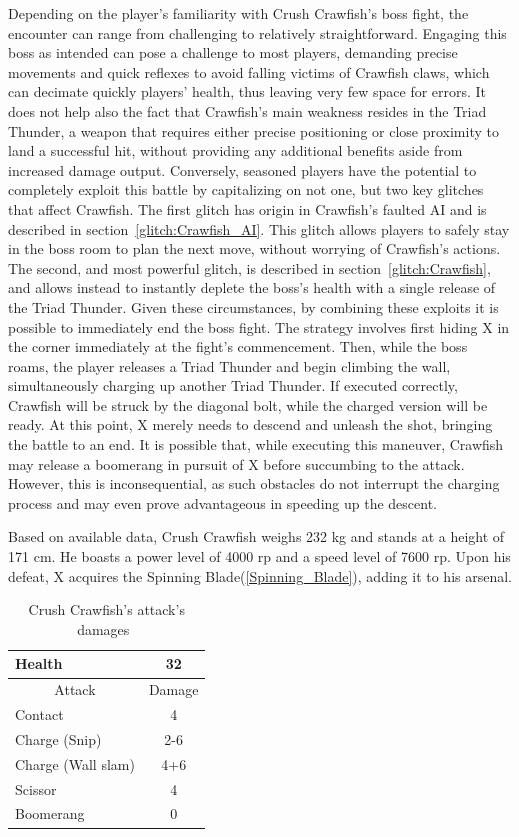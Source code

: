 Depending on the player's familiarity with Crush Crawfish's boss fight, the encounter can range from challenging to relatively straightforward. Engaging this boss as intended can pose a challenge to most players, demanding precise movements and quick reflexes to avoid falling victims of Crawfish claws, which can decimate quickly players' health, thus leaving very few space for errors. It does not help also the fact that Crawfish's main weakness resides in the Triad Thunder, a weapon that requires either precise positioning or close proximity to land a successful hit, without providing any additional benefits aside from increased damage output. Conversely, seasoned players have the potential to completely exploit this battle by capitalizing on not one, but two key glitches that affect Crawfish. The first glitch has origin in Crawfish's faulted AI  and is described in section~\ref{glitch:Crawfish_AI}. This glitch allows players to safely stay in the boss room to plan the next move, without worrying of Crawfish's actions. The second, and most powerful glitch, is described in section~\ref{glitch:Crawfish}, and allows instead to instantly deplete the boss's health with a single release of the Triad Thunder. Given these circumstances, by combining these exploits it is possible to immediately end the boss fight. The strategy involves first hiding X in the corner immediately at the fight's commencement. Then, while the boss roams, the player releases a Triad Thunder and begin climbing the wall, simultaneously charging up another Triad Thunder. If executed correctly, Crawfish will be struck by the diagonal bolt, while the charged version will be ready. At this point, X merely needs to descend and unleash the shot, bringing the battle to an end. It is possible that, while executing this maneuver, Crawfish may release a boomerang in pursuit of X before succumbing to the attack. However, this is inconsequential, as such obstacles do not interrupt the charging process and may even prove advantageous in speeding up the descent.


Based on available data, Crush Crawfish weighs 232 kg and stands at a height of 171 cm. He boasts a power level of 4000 rp and a speed level of 7600 rp. Upon his defeat, X acquires the Spinning Blade(\ref{Spinning_Blade}), adding it to his arsenal.

\begin{table}[htp]
	\centering
	\begin{tabular}[h]{l c}
		\toprule
		Health  & 32\\
		\midrule
		\multicolumn{1}{c}{Attack} & \multicolumn{1}{c}{Damage}\\
		Contact & 4\\
		Charge (Snip)& 2-6\\
		Charge (Wall slam)& 4+6\\
		Scissor& 4\\
		Boomerang & 0\\
		\bottomrule
	\end{tabular}
	\caption{Crush Crawfish's attack's damages~\cite{wiki:Crush_crawfish,book:Compendium}}
\end{table} 

